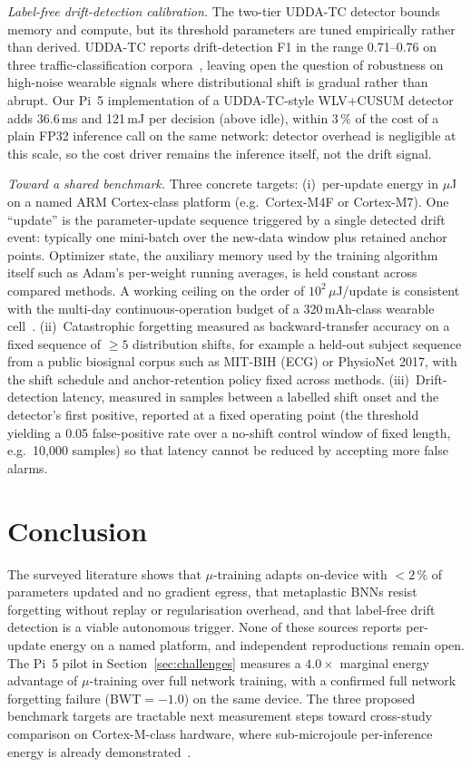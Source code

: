 \documentclass[conference]{IEEEtran}
\begin{document}
\textit{Label-free drift-detection calibration.} The two-tier
UDDA-TC detector bounds memory and compute, but its threshold
parameters are tuned empirically rather than derived. UDDA-TC
reports drift-detection F1 in the range 0.71--0.76 on three
traffic-classification corpora~\cite{b6}, leaving open the question
of robustness on high-noise wearable signals where distributional
shift is gradual rather than abrupt. Our Pi~5 implementation of
a UDDA-TC-style WLV+CUSUM detector adds 36.6\,ms and 121\,mJ per
decision (above idle), within $3\,\%$ of the cost of a plain FP32
inference call on the same network: detector overhead is
negligible at this scale, so the cost driver remains the
inference itself, not the drift signal.

\textit{Toward a shared benchmark.} Three concrete targets:
(i)~per-update energy in $\mu$J on a named ARM Cortex-class
platform (e.g.\ Cortex-M4F or Cortex-M7). One ``update'' is the
parameter-update sequence triggered by a single detected drift
event: typically one mini-batch over the new-data window plus
retained anchor points. Optimizer state, the auxiliary memory used
by the training algorithm itself such as Adam's per-weight running
averages, is held constant across compared methods. A working
ceiling on the order of $10^{2}\,\mu$J/update is consistent with
the multi-day continuous-operation budget of a 320\,mAh-class
wearable cell~\cite{b10}.
(ii)~Catastrophic forgetting measured as backward-transfer
accuracy on a fixed sequence of $\geq 5$ distribution shifts, for
example a held-out subject sequence from a public biosignal corpus
such as MIT-BIH (ECG) or PhysioNet 2017, with the shift schedule
and anchor-retention policy fixed across methods.
(iii)~Drift-detection latency, measured in samples between a
labelled shift onset and the detector's first positive, reported
at a fixed operating point (the threshold yielding a 0.05
false-positive rate over a no-shift control window of fixed
length, e.g.\ 10{,}000 samples) so that latency cannot be reduced
by accepting more false alarms.

\section{Conclusion}
\label{sec:conclusion}

The surveyed literature shows that $\mu$-training adapts on-device
with $<2\,\%$ of parameters updated and no gradient egress, that
metaplastic BNNs resist forgetting without replay or regularisation
overhead, and that label-free drift detection is a viable
autonomous trigger. None of these sources reports per-update energy
on a named platform, and independent reproductions remain open. The
Pi~5 pilot in Section~\ref{sec:challenges} measures a $4.0{\times}$
marginal energy advantage of $\mu$-training over full network
training, with a confirmed full network forgetting failure
(BWT$=-1.0$) on the same device. The three proposed benchmark
targets are tractable next measurement steps toward cross-study
comparison on Cortex-M-class hardware, where sub-microjoule
per-inference energy is already demonstrated~\cite{b10}.
\end{document}
